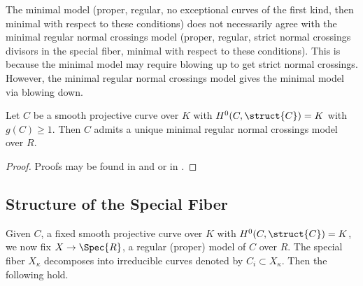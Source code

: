 \begin{remark}
The minimal model (proper, regular, no exceptional curves of the first kind, then minimal with respect to these conditions) does not necessarily agree with the minimal regular normal crossings model (proper, regular, strict normal  crossings divisors in the special fiber, minimal with respect to these conditions). This is because the minimal model may require blowing up to get strict normal crossings. However, the minimal regular normal crossings model gives the minimal model via blowing down. 
\end{remark}

\begin{theorem}
Let $C$ be a smooth projective curve over $K$ with $H^0(C, \struct{C}) = K$ with $g(C) \ge 1$. Then $C$ admits a unique minimal regular normal crossings model over $R$.
\end{theorem}

\begin{proof}
Proofs may be found in \cite[Sec. 9, Cor. 2.30]{liu} and \cite[Sec. 9, Thm. 3.36]{liu} or in \cite[Thm. 2.5.2]{romagny_models}.
\end{proof}

\subsection{Structure of the Special Fiber}

Given $C$, a fixed smooth projective curve over $K$ with $H^0(C, \struct{C}) = K$, we now fix $X \to \Spec{R}$, a regular (proper) model of $C$ over $R$. The special fiber $X_\kappa$ decomposes into irreducible curves denoted by $C_i \subset X_\kappa$. Then the following hold.

